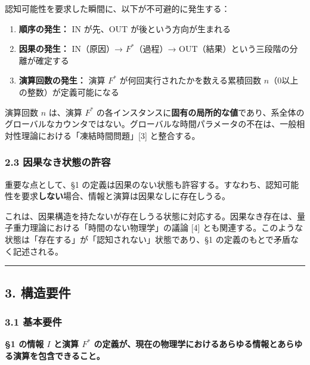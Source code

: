 \documentclass[a4paper,11pt]{ltjsarticle}
\providecommand{\tightlist}{\setlength{\itemsep}{0pt}\setlength{\parskip}{0pt}}
\begin{document}
認知可能性を要求した瞬間に、以下が不可避的に発生する：

\begin{enumerate}
\def\labelenumi{\arabic{enumi}.}
\tightlist
\item
  \textbf{順序の発生：} \(\mathrm{IN}\) が先、\(\mathrm{OUT}\)
  が後という方向が生まれる
\item
  \textbf{因果の発生：} \(\mathrm{IN}\)（原因）→ \(F^*\)（過程）→
  \(\mathrm{OUT}\)（結果）という三段階の分離が確定する
\item
  \textbf{演算回数の発生：} 演算 \(F^*\)
  が何回実行されたかを数える累積回数
  \(n\)（0以上の整数）が定義可能になる
\end{enumerate}

演算回数 \(n\) は、演算 \(F^*\)
の各インスタンスに\textbf{固有の局所的な値}であり、系全体のグローバルなカウンタではない。グローバルな時間パラメータの不在は、一般相対性理論における「凍結時間問題」{[}3{]}
と整合する。

\subsubsection{2.3
因果なき状態の許容}\label{ux56e0ux679cux306aux304dux72b6ux614bux306eux8a31ux5bb9}

重要な点として、§1
の定義は因果のない状態も許容する。すなわち、認知可能性を要求\textbf{しない}場合、情報と演算は因果なしに存在しうる。

これは、因果構造を持たないが存在しうる状態に対応する。因果なき存在は、量子重力理論における「時間のない物理学」の議論
{[}4{]}
とも関連する。このような状態は「存在する」が「認知されない」状態であり、§1
の定義のもとで矛盾なく記述される。

\begin{center}\rule{0.5\linewidth}{0.5pt}\end{center}

\subsection{3. 構造要件}\label{ux69cbux9020ux8981ux4ef6}

\subsubsection{3.1 基本要件}\label{ux57faux672cux8981ux4ef6}

\textbf{§1 の情報 \(I\) と演算 \(F^*\)
の定義が、現在の物理学におけるあらゆる情報とあらゆる演算を包含できること。}
\end{document}
